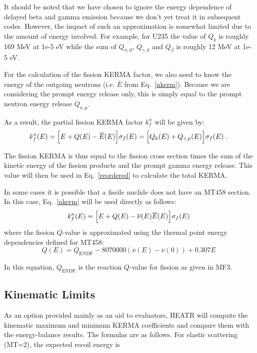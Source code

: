 It should be noted that we have chosen to ignore the energy dependence
of delayed beta and gamma emission because we don't yet treat it in
subsequent codes. However, the impact of such an approximation is somewhat
limited due to the amount of energy involved. For example, for U235 the
value of $Q_k$ is roughly 169 MeV at 1e-5 eV while the sum of $Q_{n,d}$,
$Q_{\gamma,d}$ and $Q_{\beta}$ is roughly 12 MeV at 1e-5 eV.

For the calculation of the fission KERMA factor, we also need to know the
energy of the outgoing neutrons (i.e. $\overline{E}$ from Eq.~\ref{nkerm}).
Because we are considering the prompt energy release only, this is simply
equal to the prompt neutron energy release $Q_{n,p}$.

As a result, the partial fission KERMA factor $k_{f}^n$ will be given by:
\begin{equation}
   k_{f}^n(E)=
    \Bigl[E + Q(E) - \overline{E}(E)\Bigr]\sigma_{f}(E)
             =
    \Bigl[Q_k(E) + Q_{\gamma,p}(E)\Bigr]\sigma_{f}(E)\,\,.
\label{fkerm}
\end{equation}

The fission KERMA is thus equal to the fission cross section times the
sum of the kinetic energy of the fission products and the prompt gamma
energy release. This value will then be used in Eq.~\ref{reordered} to
calculate the total KERMA.

In some cases it is possible that a fissile nuclide does not have an
MT458 section. In this case, Eq.~\ref{nkerm} will be used directly as
follows:
\begin{equation}
   k_{f}^n(E)=
    \Bigl[E + Q(E) - \overline{\nu}(E)\overline{E}(E)\Bigr]\sigma_{f}(E)
\label{fkerm-nomt458}
\end{equation}
where the fission $Q$-value is approximated using the thermal point
energy dependencies defined for MT458:
\begin{equation}
   Q(E) = Q_{\text{ENDF}} - 8070000 \left(\overline{\nu}(E)-\overline{\nu}(0)\right) + 0.307 E
\end{equation}

In this equation, $Q_{\text{ENDF}}$ is the reaction $Q$-value for fission
as given in MF3.

\subsection{Kinematic Limits}
\label{ssHEATR_kinematiclimits}

As an option provided  mainly as an aid to evaluators, HEATR
will compute the kinematic maximum and minimum KERMA
 coefficients and compare them with the
energy-balance results.  The formulas are as follows.  For
elastic scattering (MT=2), the expected recoil energy is

